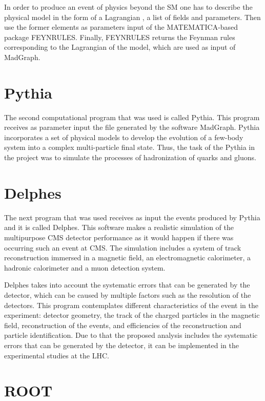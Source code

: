 In order to produce an event of physics beyond the SM one has to describe the physical model in the form of a Lagrangian , a list of fields and parameters. Then use the former elements as parameters input of the MATEMATICA-based package FEYNRULES. Finally, FEYNRULES returns the Feynman rules corresponding to the Lagrangian of the model, which are used as input of MadGraph.


\section{Pythia}

The second computational program that was used is called Pythia. This program receives as parameter input the file generated by the software MadGraph. Pythia incorporates a set of physical models to develop the evolution of a few-body system into a complex multi-particle final state. Thus, the task of the Pythia in the project was to simulate the processes of hadronization of quarks and gluons.

\section{Delphes}

The next program that was used receives as input the events produced by Pythia and it is called Delphes. This software makes a realistic simulation of the multipurpose CMS detector performance as it would happen if there was occurring such an event at CMS. The simulation includes a system of track reconstruction immersed in a magnetic field, an electromagnetic calorimeter, a hadronic calorimeter and a muon detection system.

Delphes takes into account the systematic errors that can be generated by the detector, which can be caused by multiple factors such as the resolution of the detectors. This program contemplates different characteristics of the event in the experiment: detector geometry, the track of the charged particles in the magnetic field, reconstruction of the events, and efficiencies of the reconstruction and particle identification. Due to that the proposed analysis includes the systematic errors that can be generated by the detector, it can be implemented in the experimental studies at the LHC. 

\section{ROOT}

